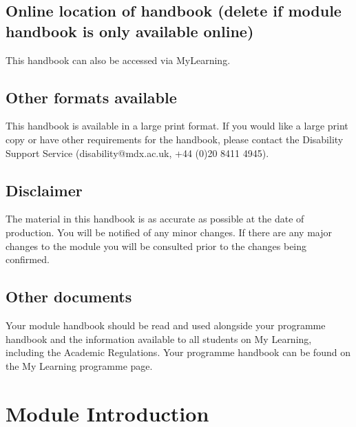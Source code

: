 \documentclass{MDXHandbook}
\begin{document}
\frontmatter
\maketitle

\section*{Online location of handbook (delete if module handbook is only available online)}
This handbook can also be accessed via MyLearning.

\section*{Other formats available}
This handbook is available in a large print format. If you would like a large print copy or have other requirements for the handbook, please contact the Disability Support Service (disability@mdx.ac.uk, +44 (0)20 8411 4945). 

\section*{Disclaimer}
The material in this handbook is as accurate as possible at the date of production. You will be notified of any minor changes. If there are any major changes to the module you will be consulted prior to the changes being confirmed. 

\section*{Other documents}
Your module handbook should be read and used alongside your programme handbook and the information available to all students on My Learning, including the Academic Regulations. Your programme handbook can be found on the My Learning programme page.

\newpage
\tableofcontents

\mainmatter
\newpage
\chapter{Module Introduction}
\end{document}
